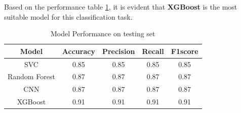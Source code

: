 \documentclass[11.5pt]{article}
\begin{document}
Based on the performance table \ref{tab:performance}, it is evident that \textbf{XGBoost} is the most suitable model for this classification task.
\begin{table}[h]
    \centering
    \begin{tabular}{ccccc}
        \toprule
        \textbf{Model} & \textbf{Accuracy} & \textbf{Precision} & \textbf{Recall} & \textbf{F1\-score} \\
        \midrule
        SVC            & 0.85              & 0.85               & 0.85            & 0.85               \\
        Random Forest  & 0.87              & 0.87               & 0.87            & 0.87               \\
        CNN            & 0.87              & 0.87               & 0.87            & 0.87               \\
        XGBoost        & 0.91              & 0.91               & 0.91            & 0.91               \\
        \bottomrule
    \end{tabular}
    \caption{Model Performance on testing set}
    \label{tab:performance}
\end{table}

\clearpage
\printbibliography[heading=bibintoc, title = {References}]
\end{document}
